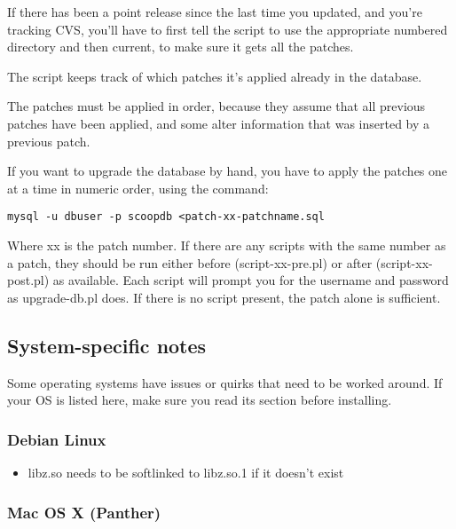 If there has been a point release since the last time you updated, and you're tracking CVS, you'll have to first tell the script to use the appropriate numbered directory and then current, to make sure it gets all the patches.

The script keeps track of which patches it's applied already in the database.

The patches must be applied in order, because they assume that all previous patches have been applied, and some alter information that was inserted by a previous patch.

If you want to upgrade the database by hand, you have to apply the patches one at a time in numeric order, using the command:

\begin{verbatim}
mysql -u dbuser -p scoopdb <patch-xx-patchname.sql
\end{verbatim}

Where xx is the patch number.  If there are any scripts with the same number as a patch, they should be run either before (script-xx-pre.pl) or after (script-xx-post.pl) as available.  Each script will prompt you for the username and password as upgrade-db.pl does.  If there is no script present, the patch alone is sufficient.

\subsection{System-specific notes}
\label{install-system-notes}

Some operating systems have issues or quirks that need to be worked around.  If your OS is listed here, make sure you read its section before installing.

\subsubsection{Debian Linux}

\begin{itemize}
\item libz.so needs to be softlinked to libz.so.1 if it doesn't exist
\end{itemize}

\subsubsection{Mac OS X (Panther)}

